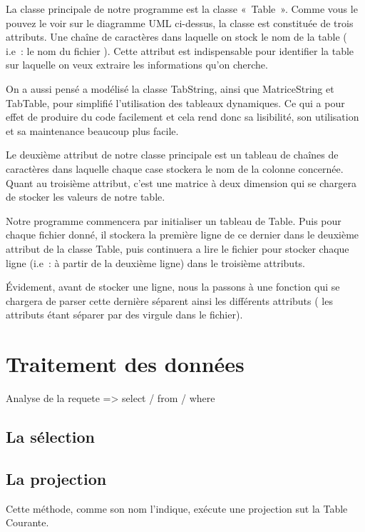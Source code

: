 \documentclass[oneside,13pt,a4paper]{report}
\begin{document}
            La classe principale de notre programme est la classe « Table ». Comme vous le pouvez le voir sur le diagramme UML ci-dessus, la classe est constituée de trois attributs. Une chaîne de caractères dans laquelle on stock le nom de la table ( i.e : le nom du fichier ). Cette attribut est indispensable pour identifier la table sur laquelle on veux extraire les informations qu’on cherche.

            On a aussi pensé a modélisé la classe TabString, ainsi que MatriceString et TabTable, pour simplifié l’utilisation des tableaux dynamiques. Ce qui a pour effet de produire du code facilement et cela rend donc sa lisibilité, son utilisation et sa maintenance beaucoup plus facile.

            Le deuxième attribut de notre classe principale est un tableau de chaînes de caractères dans laquelle chaque case stockera le nom de la colonne concernée. Quant au troisième attribut, c’est une matrice à deux dimension qui se chargera de stocker les valeurs de notre table.
            
            Notre programme commencera par initialiser un tableau de Table. Puis pour chaque fichier donné, il stockera la première ligne de ce dernier dans le deuxième attribut de la classe Table, puis continuera a lire le fichier pour stocker chaque ligne (i.e : à partir de la deuxième ligne) dans le troisième attributs.

            Évidement, avant de stocker une ligne, nous la passons à une fonction qui se chargera de parser cette dernière séparent ainsi les différents attributs ( les attributs étant séparer par des virgule dans le fichier).

        \section{Traitement des données}

            Analyse de la requete => select / from / where

            \subsection{La sélection}

            \subsection{La projection}

                Cette méthode, comme son nom l'indique, exécute une projection sut la Table Courante.
\end{document}
